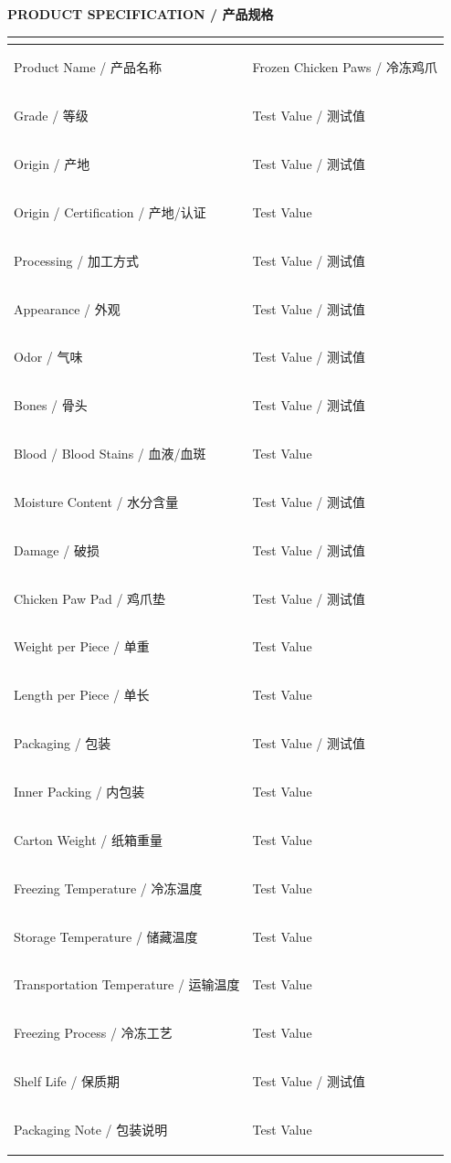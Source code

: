 \documentclass[a4paper,11pt]{article}
\begin{document}
\newpage

\begin{center}{\large\textbf{\color{marooncolor}PRODUCT SPECIFICATION / 产品规格}}\end{center}
\vspace{0.1cm}
\begin{center}
\begin{tabularx}{\textwidth}{|>{\bfseries\raggedright\arraybackslash}p{5.5cm}|>{\raggedright\arraybackslash}X|}
\hline
\multicolumn{1}{|>{\bfseries\centering\arraybackslash}p{5.5cm}|}{CATEGORY / 类别} & \multicolumn{1}{>{\bfseries\centering\arraybackslash}X|}{SPECIFICATION / 规格} \\ \hline
Product Name / 产品名称 & Frozen Chicken Paws / 冷冻鸡爪 \\ \hline
Grade / 等级 & Test Value / 测试值 \\ \hline
Origin / 产地 & Test Value / 测试值 \\ \hline
Origin / Certification / 产地/认证 & Test Value \\ \hline
Processing / 加工方式 & Test Value / 测试值 \\ \hline
Appearance / 外观 & Test Value / 测试值 \\ \hline
Odor / 气味 & Test Value / 测试值 \\ \hline
Bones / 骨头 & Test Value / 测试值 \\ \hline
Blood / Blood Stains / 血液/血斑 & Test Value \\ \hline
Moisture Content / 水分含量 & Test Value / 测试值 \\ \hline
Damage / 破损 & Test Value / 测试值 \\ \hline
Chicken Paw Pad / 鸡爪垫 & Test Value / 测试值 \\ \hline
Weight per Piece / 单重 & Test Value \\ \hline
Length per Piece / 单长 & Test Value \\ \hline
Packaging / 包装 & Test Value / 测试值 \\ \hline
Inner Packing / 内包装 & Test Value \\ \hline
Carton Weight / 纸箱重量 & Test Value \\ \hline
Freezing Temperature / 冷冻温度 & Test Value \\ \hline
Storage Temperature / 储藏温度 & Test Value \\ \hline
Transportation Temperature / 运输温度 & Test Value \\ \hline
Freezing Process / 冷冻工艺 & Test Value \\ \hline
Shelf Life / 保质期 & Test Value / 测试值 \\ \hline
Packaging Note / 包装说明 & Test Value \\ \hline
\end{tabularx}
\end{center}
\end{document}
